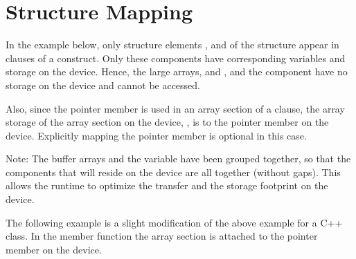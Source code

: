 \pagebreak
\section{Structure Mapping}
\label{sec:structure_mapping}



In the example below, only structure elements ,  and  
of the  structure appear in  clauses of a  construct.
Only these components have corresponding variables and storage on the device.  
Hence, the large arrays,  and , and the  component have no storage 
on the device and cannot be accessed.  

Also, since the pointer member  is used in an array section of a 
 clause, the array storage of the array section on the device, 
, is  to the pointer member  on the device.
Explicitly mapping the pointer member  is optional in this case.

Note: The buffer arrays and the  variable have been grouped together, so that
the components that will reside on the device are all together (without gaps).
This allows the runtime to optimize the transfer and the storage footprint on the device.



The following example is a slight modification of the above example for 
a C++ class.  In the member function  
the array section  is attached to the pointer member 
on the device.
 


